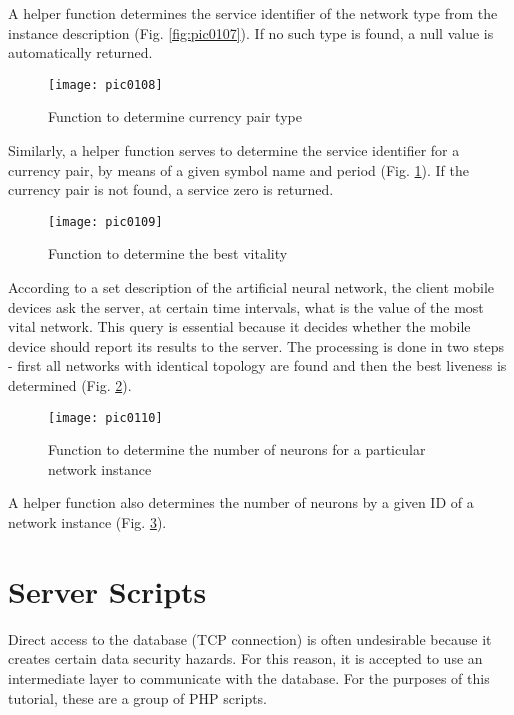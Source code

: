 A helper function determines the service identifier of the network type from the instance description (Fig. \ref{fig:pic0107}). If no such type is found, a null value is automatically returned.

\begin{figure}[h]
\centering
\texttt{[image: pic0108]}
\caption{Function to determine currency pair type}
\label{fig:pic0108}
\end{figure}
\FloatBarrier

Similarly, a helper function serves to determine the service identifier for a currency pair, by means of a given symbol name and period (Fig. \ref{fig:pic0108}). If the currency pair is not found, a service zero is returned.

\begin{figure}[h]
\centering
\texttt{[image: pic0109]}
\caption{Function to determine the best vitality}
\label{fig:pic0109}
\end{figure}
\FloatBarrier

According to a set description of the artificial neural network, the client mobile devices ask the server, at certain time intervals, what is the value of the most vital network. This query is essential because it decides whether the mobile device should report its results to the server. The processing is done in two steps - first all networks with identical topology are found and then the best liveness is determined (Fig. \ref{fig:pic0109}).

\begin{figure}[h]
\centering
\texttt{[image: pic0110]}
\caption{Function to determine the number of neurons for a particular network instance}
\label{fig:pic0110}
\end{figure}
\FloatBarrier

A helper function also determines the number of neurons by a given ID of a network instance (Fig. \ref{fig:pic0110}).

\section{Server Scripts}

Direct access to the database (TCP connection) is often undesirable because it creates certain data security hazards. For this reason, it is accepted to use an intermediate layer to communicate with the database. For the purposes of this tutorial, these are a group of PHP scripts.

